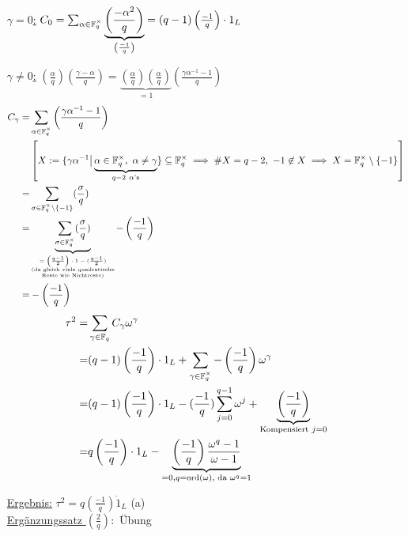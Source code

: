 \documentclass[a4paper,DIV15,BCOR12mm]{article}
\begin{document}
\begin{itemize}
    \item[\underline{$\gamma = 0$:}] $C_0 = \sum_{\alpha \in \mathbb{F}_q^\times}\underbrace{\left(\frac{-\alpha^2}{q}\right)}_{\left(\frac{-1}{q}\right)} = (q-1)\left(\frac{-1}{q}\right)\cdot
 1_L$
    \item[\underline{$\gamma \not= 0$:}] $\left(\frac{\alpha}{q}\right)\left(\frac{\gamma - \alpha}{q}\right) = \underbrace{\left(\frac{\alpha}{q}\right)\left(\frac{\alpha}{q}\right)}_{= 1}\left(\frac{\gamma \alpha^{-1} -1}{q}\right)$
    \begin{align*}
        C_\gamma =& \sum_{\alpha \in \mathbb{F}_q^\times}\left(\frac{\gamma \alpha^{-1} - 1}{q}\right) \\
        & \left[X := \{\gamma \alpha^{-1} \big| \underbrace{\alpha \in \mathbb{F}_q^\times,\ \alpha \neq \gamma}_{q-2 \ \alpha\text{'s}}\} \subseteq \mathbb{F}_q^\times \implies \#X = q-2,\ -1 \not\in X \implies X = \mathbb{F}_q^\times \setminus \{-1\}\right] \\
        =& \sum_{\sigma \in \mathbb{F}_q^\times \backslash \{-1\}} (\frac{\sigma}{q}) \\
        =& \underbrace{\sum_{\sigma \in \mathbb{F}_q^\times} (\frac{\sigma}{q})}_{\tiny\begin{matrix}
             =\left(\frac{q-1}{2}\right)\cdot 1 - (\frac{q-1}{2})\\
             \text{(da gleich viele quadratische}\\ \text{Reste wie Nichtreste)}
             \end{matrix}}-\left(\frac{-1}{q}\right) \\
        =& - \left(\frac{-1}{q}\right)
    \end{align*}
    \begin{align*}
        \tau^2 =& \sum_{\gamma \in \mathbb{F}_q}C_\gamma \omega^\gamma \\
        =& (q-1)\left(\frac{-1}{q}\right)\cdot 1_L + \sum_{\gamma \in \mathbb{F}_q^\times}-\left(\frac{-1}{q}\right)\omega^\gamma \\
        =& (q-1)\left(\frac{-1}{q}\right)\cdot 1_L - (\frac{-1}{q})\sum_{j=0}^{q-1}\omega^j + \underbrace{\left(\frac{-1}{q}\right)}_{\text{Kompensiert } j=0} \\
        =& q\left(\frac{-1}{q}\right)\cdot 1_L - \underbrace{\left(\frac{-1}{q}\right)\frac{\omega^q - 1}{\omega - 1}}_{=0, q = \mathop{\rm ord}\nolimits(\omega) \text{, da } \omega^q = 1}
    \end{align*}
    \item []    \underline{Ergebnis:} $\tau^2 = q\left(\frac{-1}{q}\right) \dot 1_L$ (a)\\
        \underline{Ergänzungssatz $\left(\frac{2}{q}\right):$} Übung
\end{itemize}
\end{document}
